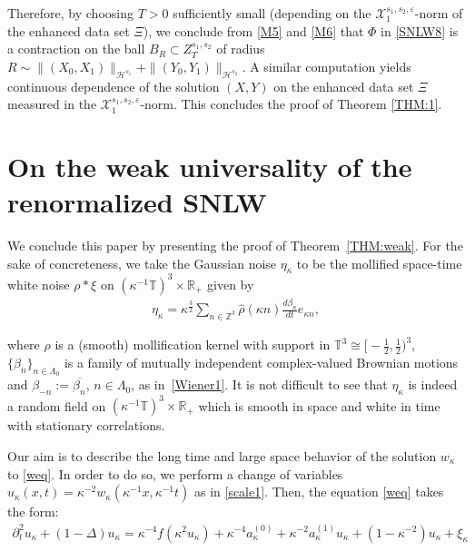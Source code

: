 \documentclass[%
11pt,  reqno]{amsart}
\newcommand{\1}{\hspace{0.2mm}\text{I}\hspace{0.2mm}}
\newcommand{\noi}{\noindent}
\newcommand{\Z}{\mathbb{Z}}
\newcommand{\R}{\mathbb{R}}
\newcommand{\T}{\mathbb{T}}
\newcommand{\be}{\beta}
\newcommand{\Dl}{\Delta}
\newcommand{\eps}{\varepsilon}
\newcommand{\kk}{\kappa}
\newcommand{\Ld}{\Lambda}
\newcommand{\ft}{\widehat}
\newcommand{\cj}{\overline}
\newcommand{\dt}{\partial_t}
\renewcommand{\H}{\mathcal{H}}
\numberwithin{equation}{section}
\numberwithin{theorem}{section}
\begin{document}
\noi
Therefore, by choosing $T>0$ sufficiently small
(depending on the $\mathcal{X}^{s_1, s_2,\eps}_1$-norm
of the  enhanced data set $\Xi$), 
we conclude from \eqref{M5} and \eqref{M6} that $\Phi$ in \eqref{SNLW8}
is a contraction on the ball $B_R \subset Z^{s_1, s_2}_T$
of radius $R\sim 
\| (X_0, X_1) \|_{\H^{s_1}}
+ \| (Y_0, Y_1) \|_{\H^{s_2}}$.
A similar computation yields 
continuous dependence of the solution $(X, Y)$
on the enhanced data set $\Xi$
measured in the $\mathcal{X}^{s_1, s_2,\eps}_1$-norm.
This concludes the proof of 
Theorem \ref{THM:1}.






\section{On the weak universality of the renormalized SNLW}


We conclude this paper by presenting the proof of
Theorem~\ref{THM:weak}. 
For the sake of concreteness, 
we take the Gaussian noise $\eta_\kk$ %
to be the mollified space-time white noise $\rho * \xi$ on $(\kk^{-1} \T)^3 \times \R_+$
given by 
\begin{align}
\eta_\kk  
=  \kk^{\frac{3}{2}} \sum_{n\in \Z^3}  \ft \rho (\kk n)  \frac{d\beta_n}{dt} e_{\kk n},
\label{eta-kappa}
\end{align}

\noi
where $\rho$ is a (smooth) 
mollification kernel with  support in $\T^3 \cong \big[-\frac 12,\frac 12\big)^3$,
 $\{\beta_n\}_{n \in \Ld_0}$
 is a family of mutually independent complex-valued
Brownian motions and  $\beta_{-n} := \cj{\be_n}$, $n \in \Ld_0$,  as in~\eqref{Wiener1}. 
It is not difficult to see that $\eta_\kk$ is indeed a random field on 
$(\kk^{-1} \T)^3\times \R_+$ which is smooth in space and white in time with stationary correlations. 


Our aim is to describe the long time and large space behavior of the solution $w_\kk$
to \eqref{weq}.
In order to do so, we perform a change of variables 
$u_{\kk} (x, t) = \kk^{- 2} w_{\kk} (\kk^{-1} x, \kk^{-1} t)$ as in \eqref{scale1}.
Then, the equation \eqref{weq}  takes the form:
\begin{align}
\dt^2 u_{\kk} + (1 - \Dl) u_{\kk}
 = \kk^{- 4}  f (\kk^{2} u_{\kk} ) + \kk^{- 4}
   a_{\kk}^{(0)} + \kk^{- 2} a_{\kk}^{(1)} u_{\kk}
   + (1-\kk^{-2})u_\kk
    +  \xi_{\kk} 
\label{WU1}
\end{align}
\end{document}
